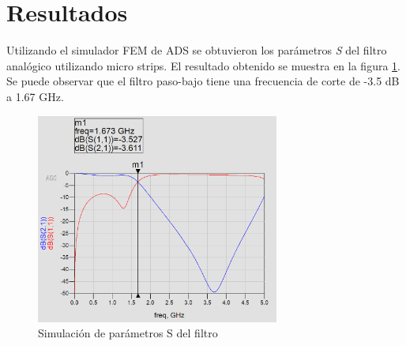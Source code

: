 \section{Resultados}

Utilizando el simulador FEM de ADS se obtuvieron los parámetros \textit{S} del filtro analógico utilizando micro strips. El resultado obtenido se muestra en la figura     \ref{fig:resultado_parametros_s}. Se puede observar que el filtro paso-bajo tiene una frecuencia de corte de -3.5 dB a 1.67 GHz.

\begin{figure}[!ht]
    \centering
    \includegraphics[width=8cm]{figures/resultado.png}
    \caption{Simulación de parámetros S del filtro}
    \label{fig:resultado_parametros_s}
\end{figure}
